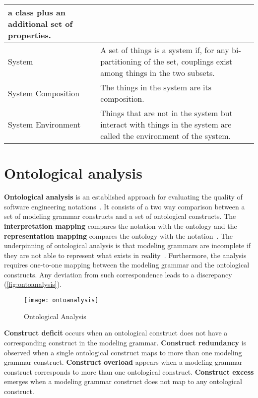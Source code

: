 \begin{center}
\begin{longtable}{ | p{11em} | p{30em} | }
a class plus an additional set of properties.~\cite{weber1996analytical} \\ 
\hline
 System & A set of things is a system if, for any bi-partitioning of the set, couplings exist among things in the two subsets.~\cite{wand1995deep} \\
 \hline
 System Composition & The things in the system are its composition.~\cite{wand1995deep} \\
 \hline
 System Environment &  Things that are not in the system but interact with things in the system are called the environment of the system.~\cite{wand1995deep} \\
 \hline
\end{longtable}
\end{center}


\section{Ontological analysis}

\textbf{Ontological analysis} is an established approach for evaluating the quality of software engineering notations~\cite{moody2009physics}. It consists of a two way comparison between a set of modeling grammar constructs and a set of ontological constructs. The \textbf{interpretation mapping} compares the notation with the ontology and the \textbf{representation mapping} compares the ontology with the notation~\cite{gehlert2007toward}. The underpinning of ontological analysis is that modeling grammars are incomplete if they are not able to represent what exists in reality~\cite{green2000integrated}. Furthermore, the analysis requires one-to-one mapping between the modeling grammar and the ontological constructs. Any deviation from such correspondence leads to a discrepancy (\autoref{fig:ontoanalysis}).

\begin{figure}[h!]
  \centering
  \caption{Ontological Analysis~\cite{gehlert2007toward}}
  \label{fig:ontoanalysis}
  \texttt{[image: ontoanalysis]}
\end{figure}

\textbf{Construct deficit} occurs when an ontological construct does not have a corresponding construct in the modeling grammar. \textbf{Construct redundancy} is observed when a single ontological construct maps to more than one modeling grammar construct. \textbf{Construct overload} appears when a modeling grammar construct corresponds to more than one ontological construct. \textbf{Construct excess} emerges when a modeling grammar construct does not map to any ontological construct.~\cite{moody2009physics}

